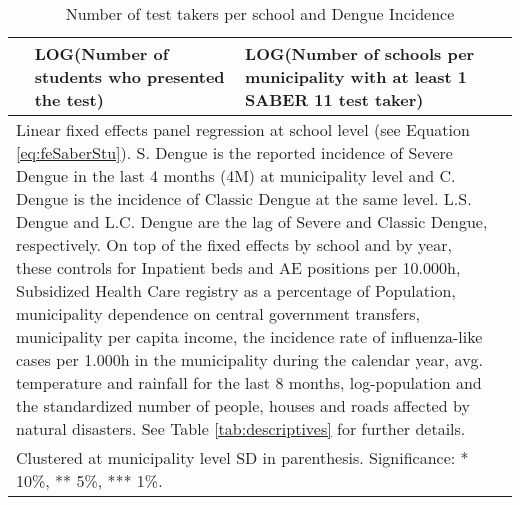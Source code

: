 {
\def\sym#1{\ifmmode^{#1}\else\(^{#1}\)\fi}
\begin{table}[H]
\centering
\scriptsize
\caption{Number of test takers per school and Dengue Incidence \label{tableSchool_main}}
\begin{tabular}{l*{9}{c}}
\toprule
& \multicolumn{4}{l}{ LOG(Number of students who presented the test) } & \multicolumn{4}{l}{\parbox[c]{5cm}{ LOG(Number of schools per municipality with at least 1 SABER 11 test taker) }} \\
\cmidrule(l){2-5}  \cmidrule(l){6-9}
\bottomrule
\multicolumn{9}{l}{\parbox[l]{15cm}{Linear fixed effects panel regression at school level (see Equation \ref{eq:feSaberStu}). S. Dengue is the reported incidence of Severe Dengue in the last 4 months (4M) at municipality level and C. Dengue is the incidence of Classic Dengue at the same level. L.S. Dengue and L.C. Dengue are the lag of Severe and Classic Dengue, respectively. On top of the fixed effects by school and by year, these controls for Inpatient beds and AE positions per 10.000h, Subsidized Health Care registry as a percentage of Population, municipality dependence on central government transfers, municipality per capita income, the incidence rate of influenza-like cases per 1.000h in the municipality during the calendar year, avg. temperature and rainfall for the last 8 months, log-population and the standardized number of people, houses and roads affected by natural disasters. See Table \ref{tab:descriptives} for further details.}} \\
\multicolumn{9}{l}{Clustered at municipality level SD in parenthesis. Significance: * 10\%, ** 5\%, *** 1\%. } \\
\end{tabular}
\end{table}
}
